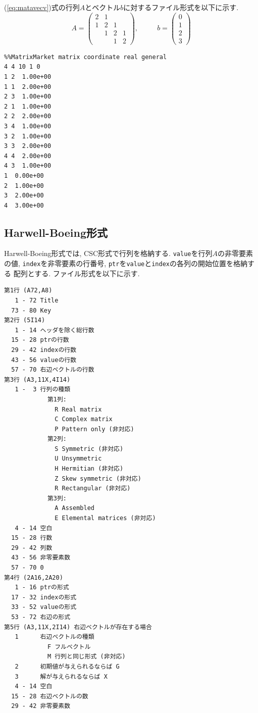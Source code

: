\documentclass[a4paper]{jarticle}
\begin{document}
{{(\ref{eq:matavecv})式の行列$A$とベクトル$b$に対するファイル形式を以下に示す. 
\begin{equation}
A = 
\left(
\begin{array}{cccc}
2 & 1 &   &    \\
1 & 2 & 1 &    \\ 
  & 1 & 2 & 1 \\
  &   & 1 & 2 
\end{array}
\right), 
~~~~~~~~~~~~
b = 
\left(
\begin{array}{c}
0 \\
1 \\ 
2 \\
3  
\end{array}
\right)
\label{eq:matavecv}
\end{equation}

{\small
\begin{verbatim}
%%MatrixMarket matrix coordinate real general
4 4 10 1 0
1 2  1.00e+00
1 1  2.00e+00
2 3  1.00e+00
2 1  1.00e+00
2 2  2.00e+00
3 4  1.00e+00
3 2  1.00e+00
3 3  2.00e+00
4 4  2.00e+00
4 3  1.00e+00
1  0.00e+00
2  1.00e+00
3  2.00e+00
4  3.00e+00
\end{verbatim}
}

\subsection{Harwell-Boeing形式}
Harwell-Boeing形式では, CSC形式で行列を格納する. 
{\tt value}を行列$A$の非零要素の値, {\tt index}を非零要素の行番号, 
{\tt ptr}を{\tt value}と{\tt index}の各列の開始位置を格納する
配列とする. ファイル形式を以下に示す.

{\small
\begin{verbatim}
第1行 (A72,A8)
   1 - 72 Title
  73 - 80 Key
第2行 (5I14)
   1 - 14 ヘッダを除く総行数
  15 - 28 ptrの行数
  29 - 42 indexの行数
  43 - 56 valueの行数
  57 - 70 右辺ベクトルの行数
第3行 (A3,11X,4I14)
   1 -  3 行列の種類
            第1列: 
              R Real matrix
              C Complex matrix
              P Pattern only (非対応)
            第2列: 
              S Symmetric (非対応)
              U Unsymmetric
              H Hermitian (非対応)
              Z Skew symmetric (非対応)
              R Rectangular (非対応)
            第3列: 
              A Assembled
              E Elemental matrices (非対応)
   4 - 14 空白
  15 - 28 行数
  29 - 42 列数
  43 - 56 非零要素数
  57 - 70 0
第4行 (2A16,2A20)
   1 - 16 ptrの形式
  17 - 32 indexの形式
  33 - 52 valueの形式
  53 - 72 右辺の形式
第5行 (A3,11X,2I14) 右辺ベクトルが存在する場合
   1      右辺ベクトルの種類
            F フルベクトル
            M 行列と同じ形式 (非対応)
   2      初期値が与えられるならば G
   3      解が与えられるならば X
   4 - 14 空白
  15 - 28 右辺ベクトルの数
  29 - 42 非零要素数
\end{verbatim}
}

}}
\end{document}
